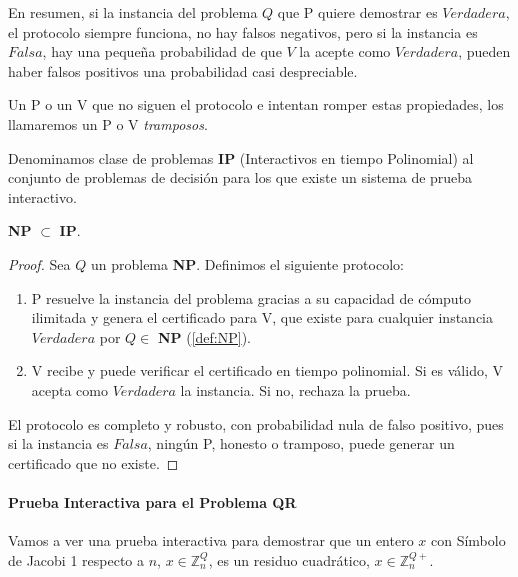 En resumen, si la instancia del problema $Q$ que P quiere demostrar es $Verdadera$, el protocolo siempre funciona, no hay falsos negativos, pero si la instancia es $Falsa$, hay una pequeña probabilidad de que $V$ la acepte como $Verdadera$, pueden haber falsos positivos una probabilidad casi despreciable.

Un P o un V que no siguen el protocolo e intentan romper estas propiedades, los llamaremos un P o V \textit{tramposos}.


\begin{definition}
	Denominamos clase de problemas \textbf{IP} (Interactivos en tiempo Polinomial) al conjunto de problemas de decisión para los que existe un sistema de prueba interactivo.
\end{definition}

\begin{proposition}
	\textbf{NP} $\subset$ \textbf{IP}.
\end{proposition}

\begin{proof}
	Sea $Q$ un problema \textbf{NP}. Definimos el siguiente protocolo:

	\begin{enumerate}
		\item  P resuelve la instancia del problema gracias a su capacidad de cómputo ilimitada y genera el certificado para V, que existe para cualquier instancia $Verdadera$ por $Q\in$ \textbf{NP} (\ref{def:NP}).
		\item  V recibe y puede verificar el certificado en tiempo polinomial. Si es válido, V acepta como $Verdadera$ la instancia. Si no, rechaza la prueba.
	\end{enumerate}

	El protocolo es completo y robusto, con probabilidad nula de falso positivo, pues si la instancia es $Falsa$, ningún P, honesto o tramposo, puede generar un certificado que no existe.

\end{proof}


\hfil

\paragraph{Prueba Interactiva para el Problema QR}

\hfil

\hfil

Vamos a ver una prueba interactiva para demostrar que un entero $x$ con Símbolo de Jacobi 1 respecto a $n$, $x \in \mathbb{Z}^Q_n$, es un residuo cuadrático, $x \in \mathbb{Z}^{Q+}_n$.


